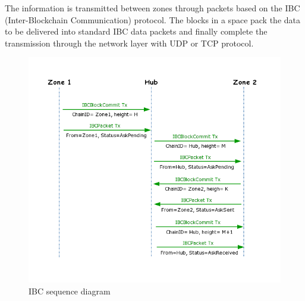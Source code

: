 \noindent The information is transmitted between zones through packets based on the IBC (Inter-Blockchain Communication) protocol. The blocks in a space pack the data to be delivered into standard IBC data packets and finally complete the transmission through the network layer with UDP or TCP protocol.
        \begin{figure}[H]
        \includegraphics[width=1\textwidth]{./figures/IBC.png}
        \centering
        \caption{IBC sequence diagram}%
        \centering
        \label{fig:IBC}
        \end{figure}
